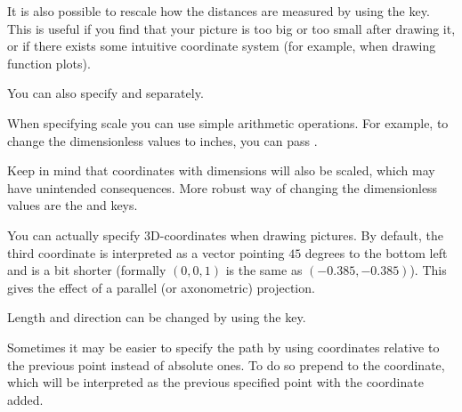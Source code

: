 It is also possible to rescale how the distances are measured by using the
 key. This is useful if you find that your picture is too big or
too small after drawing it, or if there exists some intuitive coordinate system
(for example, when drawing function plots).
\begin{example}
\end{example}
You can also specify  and  separately.

When specifying scale you can use simple arithmetic operations. For example, to
change the dimensionless values to inches, you can pass .
\begin{example}
\end{example}
Keep in mind that coordinates with dimensions will also be scaled, which may
have unintended consequences. More robust way of changing the dimensionless
values are the  and  keys.
\begin{example}
\end{example}

You can actually specify 3D-coordinates when drawing pictures.
By default, the third coordinate is interpreted as a vector pointing \(45\)
degrees to the bottom left and is a bit shorter (formally \((0, 0, 1)\) is  the
same as \((-0.385, -0.385)\)). This gives the effect of a parallel (or
axonometric) projection.
\begin{example}[vertical_mode, examplewidth=0.85\linewidth]
\end{example}
Length and direction can be changed by using the  key.

Sometimes it may be easier to specify the path by using coordinates relative to
the previous point instead of absolute ones. To do so prepend \ltx{++} to the
coordinate, which will be interpreted as the previous specified point with the
coordinate added.
\begin{example}
\end{example}


